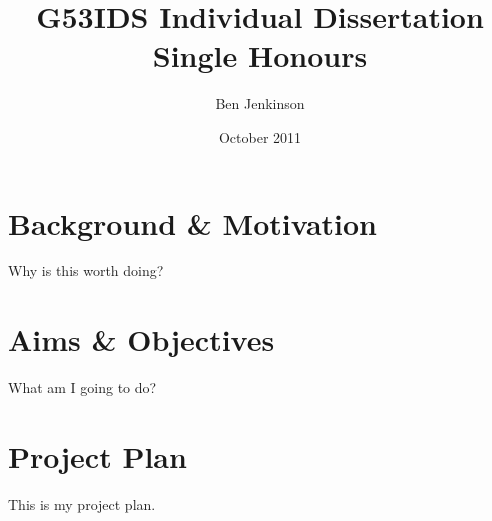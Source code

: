 \documentclass[a4paper]{article}
\title{G53IDS Individual Dissertation Single Honours}
\author{Ben Jenkinson}
\date{October 2011}
\begin{document}
	

	\section{Background \& Motivation}
	
	Why is this worth doing?

	\section{Aims \& Objectives}

	What am I going to do?
	
	\section{Project Plan}
	
	This is my project plan.
\end{document}

